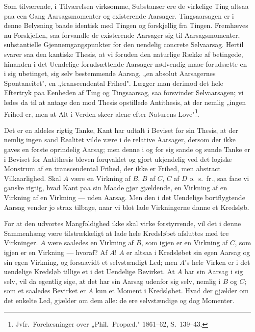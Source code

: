 \documentclass[12pt]{book}
\newcommand{\opage}[1]{\marginnote{\footnotesize\textit{[#1]}}}
\begin{document}
Som tilværende, i Tilværelsen virksomme, Substanser ere de virkelige Ting altsaa paa een
Gang Aarsagsmomenter og existerende Aarsager. Tingsaarsagen er i denne Belysning baade
identisk med Tingen og forskjellig fra Tingen. Fremhæves nu Forskjellen, saa forvandle de
existerende Aarsager sig til Aarsagsmomenter, substantielle Gjennemgangspunkter for den
uendelig concrete Selvaarsag. Hertil svarer saa den kantiske Thesis, at vi foruden den
naturlige Række af betingede, hinanden i det Uendelige forudsættende Aarsager nødvendig
maae forudsætte en i sig ubetinget, sig selv bestemmende Aarsag, „en absolut Aarsagernes
Spontaneitet", en „transcendental Frihed". Lægger man derimod det hele Eftertryk paa
Eenheden af Ting og Tingsaarsag, saa forsvinder Selvaarsagen; vi ledes da til at antage
den mod Thesis opstillede Antithesis, at der nemlig „ingen Frihed er, men at Alt i Verden
skeer alene efter Naturens Love"\footnote{Jvfr.\ Forelæsninger over „Phil.\ Propæd."
1861--62, S.~139--43.}.

Det er en aldeles rigtig Tanke, Kant har udtalt i Beviset for sin Thesis, at der nemlig
ingen sand Realitet vilde være i de relative Aarsager, dersom der ikke gaves en første
oprindelig Aarsag; men denne i og for sig sande og sunde Tanke er i Beviset for
Antithesis bleven forqvaklet og gjort ukjendelig ved det logiske Monstrum af en
transcendental Frihed, der ikke er Frihed, men abstract Vilkaarlighed. Skal $A$ være en
Virkning af $B$, $B$ af $C$, $C$ af $D$ o.\ s.\ fr., saa faae vi ganske rigtig, hvad Kant
paa sin Maade gjør gjældende, en Virkning af en Virkning af en Virkning --- uden Aarsag.
Men den i det Uendelige bortflygtende Aarsag vender jo strax tilbage, naar vi blot lade
Virkningerne danne et Kredsløb.

\opage{122} For at den udvortes Mangfoldighed ikke skal virke forstyrrende, vil det i denne
Sammenhæng være tilstrækkeligt at lade hele Kredsløbet afsluttes med tre Virkninger. $A$
være saaledes en Virkning af $B$, som igjen er en Virkning af $C$, som igjen er en
Virkning --- hvoraf? Af $A$! $A$ er altsaa i Kredsløbet sin egen Aarsag og sin egen
Virkning, og forsaavidt et selvstændigt Led; men $A$'s hele Virken er i det uendelige
Kredsløb tillige et i det Uendelige Bevirket. At $A$ har sin Aarsag i sig selv, vil da
egentlig sige, at det har sin Aarsag udenfor sig selv, nemlig i $B$ og $C$; som et
saaledes Bevirket er $A$ kun et Moment i Kredsløbet. Hvad der gjælder om det enkelte Led,
gjælder om dem alle: de ere selvstændige og dog Momenter.
\end{document}
